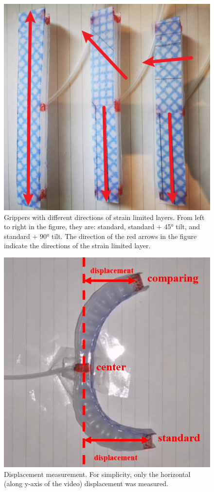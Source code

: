 \documentclass[conference]{IEEEtran}
\begin{document}
\begin{figure}
    \centering
    \includegraphics[width = 0.85\linewidth]{pics/实验示意图1.png}
    \caption{Grippers with different directions of strain limited layers. From left to right in the figure, they are: standard, standard $+$ 45° tilt, and standard $+$ 90° tilt. The direction of the red arrows in the figure indicate the directions of the strain limited layer.}
    \label{fig:Grippers}
\end{figure}

\begin{figure}
    \centering
    \includegraphics[width = 0.85\linewidth]{pics/位移计量示意图.png}
    \caption{Displacement measurement. For simplicity, only the horizontal (along y-axis of the video) displacement was measured.}
    \label{fig:Displacement}
\end{figure}
\end{document}
